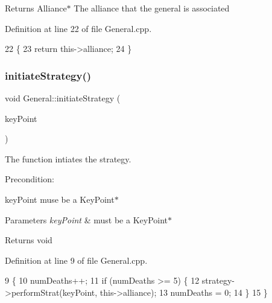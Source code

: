 \begin{DoxyReturn}{Returns}
Alliance$\ast$ The alliance that the general is associated 
\end{DoxyReturn}


Definition at line 22 of file General.\+cpp.


\begin{DoxyCode}
22                               \{
23     \textcolor{keywordflow}{return} this->alliance;
24 \}
\end{DoxyCode}
\mbox{\label{classGeneral_a7a2239276a120f53446cb60b24d61496}} 
\subsubsection{\texorpdfstring{initiate\+Strategy()}{initiateStrategy()}}
{\footnotesize\ttfamily void General\+::initiate\+Strategy (\begin{DoxyParamCaption}\item[{Key\+Point $\ast$}]{key\+Point }\end{DoxyParamCaption})}



The function intiates the strategy. 

Precondition\+:
\begin{DoxyItemize}
\item key\+Point muse be a Key\+Point$\ast$
\end{DoxyItemize}


\begin{DoxyParams}{Parameters}
{\em key\+Point} & must be a Key\+Point$\ast$ \\
\hline
\end{DoxyParams}
\begin{DoxyReturn}{Returns}
void 
\end{DoxyReturn}


Definition at line 9 of file General.\+cpp.


\begin{DoxyCode}
9                                                  \{
10     numDeaths++;
11     \textcolor{keywordflow}{if} (numDeaths >= 5) \{
12         strategy->performStrat(keyPoint, this->alliance);
13         numDeaths = 0;
14     \}
15 \}
\end{DoxyCode}
\mbox{\label{classGeneral_abe8dcb93ddb9b79bd8e75e8c642758ba}} 
